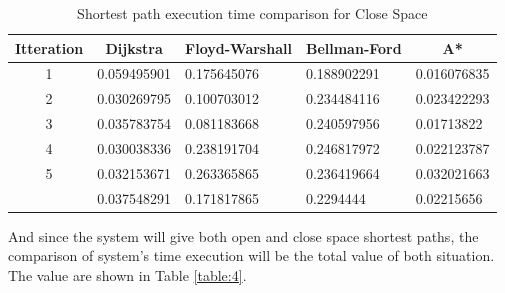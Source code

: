 \begin{table}[h!]
	\centering
	\caption{Shortest path execution time comparison for Close Space}
	\label{table:3}
	\begin{tabular}{|c|l|l|l|l|}
		\hline
		\textbf{Itteration}                                            & \multicolumn{1}{c|}{\textbf{Dijkstra}} & \multicolumn{1}{c|}{\textbf{Floyd-Warshall}} & \multicolumn{1}{c|}{\textbf{Bellman-Ford}} & \multicolumn{1}{c|}{\textbf{A*}} \\ \hline
		1                                                              & 0.059495901                            & 0.175645076                                  & 0.188902291                                & 0.016076835                      \\ \hline
		2                                                              & 0.030269795                            & 0.100703012                                  & 0.234484116                                & 0.023422293                      \\ \hline
		3                                                              & 0.035783754                            & 0.081183668                                  & 0.240597956                                & 0.01713822                       \\ \hline
		4                                                              & 0.030038336                            & 0.238191704                                  & 0.246817972                                & 0.022123787                      \\ \hline
		5                                                              & 0.032153671                            & 0.263365865                                  & 0.236419664                                & 0.032021663                      \\ \hline
		\rowcolor[HTML]{9B9B9B} 
		\multicolumn{1}{|l|}{\cellcolor[HTML]{9B9B9B}\textbf{AVERAGE}} & 0.037548291                            & 0.171817865                                  & 0.2294444                                  & 0.02215656                       \\ \hline
	\end{tabular}
\end{table}
\vspace{8mm}
And since the system will give both open and close space shortest paths, the comparison of system's time execution will be the total value of both situation. The value are shown in Table \ref{table:4}.

